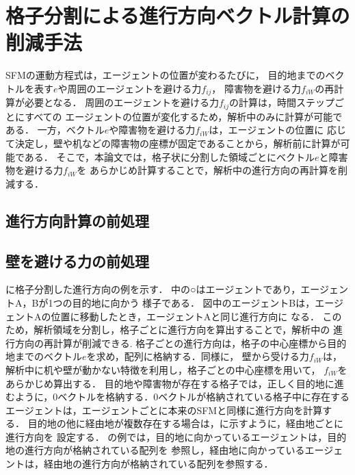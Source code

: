\chapter{格子分割による進行方向ベクトル計算の削減手法}
\label{sec:method}
SFMの運動方程式は，エージェントの位置が変わるたびに，
目的地までのベクトルを表す$e$や周囲のエージェントを避ける力$f_{ij}$，
障害物を避ける力$f_{iW}$の再計算が必要となる．
周囲のエージェントを避ける力$f_{ij}$の計算は，時間ステップごとにすべての
エージェントの位置が変化するため，解析中のみに計算が可能である．
一方，ベクトル$e$や障害物を避ける力$f_{iW}$は，エージェントの位置に
応じて決定し，壁や机などの障害物の座標が固定であることから，解析前に計算が可能である．
そこで，本論文では，格子状に分割した領域ごとにベクトル$e$と障害物を避ける力$f_{iW}$を
あらかじめ計算することで，解析中の進行方向の再計算を削減する．

\section{進行方向計算の前処理}

\section{壁を避ける力の前処理}

に格子分割した進行方向の例を示す．
中の○はエージェントであり，エージェントA，Bが1つの目的地に向かう
様子である．
図中のエージェントBは，エージェントAの位置に移動したとき，エージェントAと同じ進行方向に
なる．
このため，解析領域を分割し，格子ごとに進行方向を算出することで，解析中の
進行方向の再計算が削減できる.	
格子ごとの進行方向は，格子の中心座標から目的地までのベクトル$e$を求め，配列に格納する．同様に，
壁から受ける力$f_{iW}$は，解析中に机や壁が動かない特徴を利用し，格子ごとの中心座標を用いて，
$f_{iW}$をあらかじめ算出する．
目的地や障害物が存在する格子では，正しく目的地に進むように，0ベクトルを格納する．0ベクトルが格納されている格子中に存在する
エージェントは，エージェントごとに本来のSFMと同様に進行方向を計算する．
目的地の他に経由地が複数存在する場合は，に示すように，経由地ごとに進行方向を
設定する．
の例では，目的地に向かっているエージェントは，目的地の進行方向が格納されている配列を
参照し，経由地に向かっているエージェントは，経由地の進行方向が格納されている配列を参照する．

